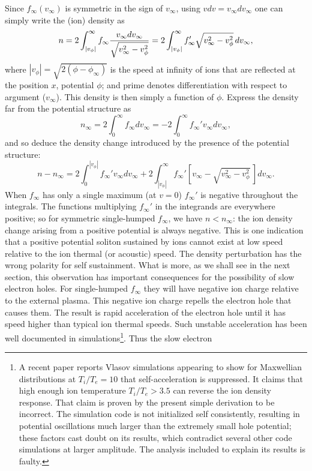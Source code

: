 \documentclass[pre]{revtex4-2}
\begin{document}
Since $f_\infty(v_\infty)$ is symmetric in the sign of $v_\infty$,
using $vdv=v_\infty dv_\infty$ one can simply write the (ion) density
as
\begin{equation}
\label{symden}
  n = 2\int_{|v_\phi|}^\infty f_\infty {v_\infty dv_\infty\over
    \sqrt{v_\infty^2-v_\phi^2} }  
  = 2\int_{|v_\phi|}^\infty f_\infty'\sqrt{v_\infty^2-v_\phi^2}\,
  dv_\infty,
\end{equation}
where $|v_\phi|=\sqrt{2(\phi-\phi_\infty)}$ is the speed at infinity
of ions that are reflected at the position $x$, potential $\phi$; and
prime denotes differentiation with respect to argument
($v_\infty$). This density is then simply a function of $\phi$.
Express the density far from the potential structure as
\begin{equation}
n_\infty=2\int_0^\infty f_\infty dv_\infty=-2\int_0^\infty f_\infty'
v_\infty dv_\infty,
\end{equation}
and so deduce the density change introduced by the presence of the
potential structure:
\begin{equation}
  n-n_\infty=2\int_0^{|v_\phi|}f_\infty'v_\infty dv_\infty +
  2\int_{|v_\phi|}^{\infty}f_\infty'\left[v_\infty-\sqrt{v_\infty^2-v_\phi^2}\,\right] dv_\infty.
\end{equation}
When $f_\infty$ has only a single maximum (at $v=0$) $f_\infty'$ is
negative throughout the integrals. The functions multiplying
$f_\infty'$ in the integrands are everywhere positive; so for
symmetric single-humped $f_\infty$, we have $n<n_\infty$: the ion
density change arising from a positive potential is always
negative. This is one indication that a positive potential soliton
sustained by ions cannot exist at low speed relative to the ion
thermal (or acoustic) speed. The density perturbation has the wrong
polarity for self sustainment. What is more, as we shall see in the
next section, this observation has important consequences for the
possibility of slow electron holes.  For single-humped $f_\infty$ they
will have negative ion charge relative to the external plasma. This
negative ion charge repells the electron hole that causes them. The result is rapid
acceleration of the electron hole until it has speed higher than
typical ion thermal speeds. Such unstable acceleration has been well
documented in simulations\cite{Eliasson2004,Zhou2016}\footnote{A
  recent paper reports Vlasov simulations
  appearing to show for Maxwellian distributions at $T_i/T_e=10$ that
  self-acceleration is suppressed. It claims that high enough ion
  temperature $T_i/T_e>3.5$ can reverse the ion density response. That
  claim is proven by the present simple derivation to be incorrect.
  The simulation code is not initialized self consistently, resulting
  in potential oscillations much larger than the extremely small hole
  potential; these factors cast doubt on its results, which contradict
  several other code simulations at larger amplitude. The analysis
  included to explain its results is faulty.}.  Thus the slow electron
\end{document}
